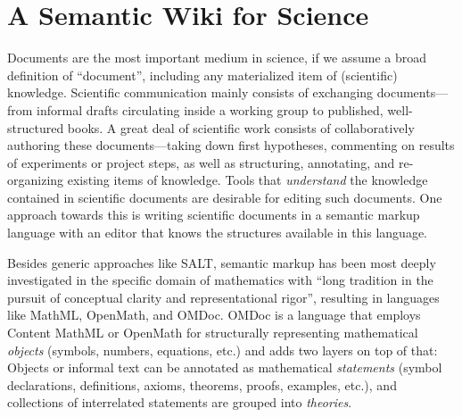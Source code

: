 \section{A Semantic Wiki for Science}
\label{sec:science}


\begin{figure}
  \centering
  \vspace{-.9cm}
  \vspace{-1.2cm}
\end{figure}
Documents are the most important medium in science, if we assume a broad definition of
``document'', including any materialized item of (scientific) knowledge.  Scientific
communication mainly consists of exchanging documents---from informal drafts circulating
inside a working group to published, well-structured books.  A great deal of scientific
work consists of collaboratively authoring these documents---taking down first hypotheses,
commenting on results of experiments or project steps, as well as structuring, annotating,
and re-organizing existing items of knowledge.  Tools that
\emph{understand} the knowledge contained in scientific documents are desirable for
editing such documents.  One approach towards this is writing scientific documents in a
semantic markup language with an editor that knows the structures available in this
language.

Besides generic approaches like SALT\cite{Groza:SALT07}, semantic markup has been most
deeply investigated in the specific domain of mathematics with ``long tradition in the
pursuit of conceptual clarity and representational rigor''\cite{Kohlhase:omdoc1.2},
resulting in languages like MathML\cite{CarlisleEd:MathML07},
OpenMath\cite{BusCapCar:2oms04}, and OMDoc\cite{Kohlhase:omdoc1.2}.  OMDoc is a language
that employs Content MathML
or OpenMath for structurally representing mathematical \emph{objects} (symbols,
numbers, equations, etc.) and adds two layers on top of that: Objects or informal text can
be annotated as mathematical \emph{statements} (symbol declarations, definitions, axioms,
theorems, proofs, examples, etc.), and collections of interrelated statements are grouped
into \emph{theories}.

